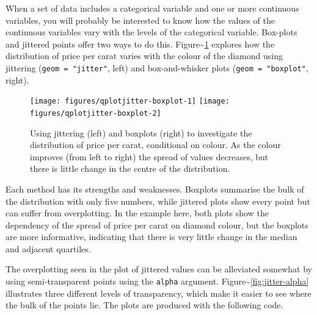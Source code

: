 
When a set of data includes a categorical variable and one or more
continuous variables, you will probably be interested to know how the
values of the continuous variables vary with the levels of the
categorical variable. Box-plots and jittered points offer two ways to do
this. Figure\textasciitilde{}\ref{fig:jitter-boxplot} explores how the
distribution of price per carat varies with the colour of the diamond
using jittering (\texttt{geom = "jitter"}, left) and box-and-whisker
plots (\texttt{geom = "boxplot"}, right). 
 

\begin{Shaded}
\begin{Highlighting}[]
\StringTok{ }  \NormalTok{)}
\StringTok{ }  \NormalTok{)}
\end{Highlighting}
\end{Shaded}

\begin{figure}
\texttt{[image: figures/qplotjitter-boxplot-1]} \texttt{[image: figures/qplotjitter-boxplot-2]} \caption{Using jittering (left) and boxplots (right) to investigate the distribution of price per carat, conditional on colour.  As the colour improves (from left to right) the spread of values decreases, but there is little change in the centre of the distribution.\label{fig:jitter-boxplot}}
\end{figure}

Each method has its strengths and weaknesses. Boxplots summarise the
bulk of the distribution with only five numbers, while jittered plots
show every point but can suffer from overplotting. In the example here,
both plots show the dependency of the spread of price per carat on
diamond colour, but the boxplots are more informative, indicating that
there is very little change in the median and adjacent quartiles.

The overplotting seen in the plot of jittered values can be alleviated
somewhat by using semi-transparent points using the \texttt{alpha}
argument. Figure\textasciitilde{}\ref{fig:jitter-alpha} illustrates
three different levels of transparency, which make it easier to see
where the bulk of the points lie. The plots are produced with the
following code. 

